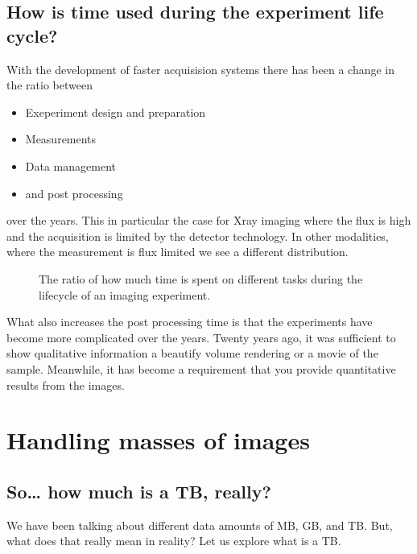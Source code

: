 \documentclass[letterpaper,10pt,english]{sphinxmanual}
\begin{document}
\subsection{How is time used during the experiment life cycle?}
\label{\detokenize{01-Introduction:how-is-time-used-during-the-experiment-life-cycle}}
\sphinxAtStartPar
With the development of faster acquisision systems there has been a change in the ratio between
\begin{itemize}
\item {} 
\sphinxAtStartPar
Exeperiment design and preparation

\item {} 
\sphinxAtStartPar
Measurements

\item {} 
\sphinxAtStartPar
Data management

\item {} 
\sphinxAtStartPar
and post processing

\end{itemize}

\sphinxAtStartPar
over the years. This in particular the case for X\sphinxhyphen{}ray imaging where the flux is high and the acquisition is limited by the detector technology. In other modalities, where the measurement is flux limited we see a different distribution.

\begin{figure}[htbp]
\centering
\capstart

\noindent{}
\caption{The ratio of how much time is spent on different tasks during the lifecycle of an imaging experiment.}\label{\detokenize{01-Introduction:id9}}\end{figure}

\sphinxAtStartPar
What also increases the post processing time is that the experiments have become more complicated over the years. Twenty years ago, it was sufficient to show qualitative information a beautify volume rendering or a movie of the sample. Meanwhile, it has become a requirement that you provide quantitative results from the images.




\section{Handling masses of images}
\label{\detokenize{01-Introduction:handling-masses-of-images}}

\subsection{So… how much is a TB, really?}
\label{\detokenize{01-Introduction:so-how-much-is-a-tb-really}}
\sphinxAtStartPar
We have been talking about different data amounts of MB, GB, and TB. But, what does that really mean in reality? Let us explore what is a TB.
\end{document}
